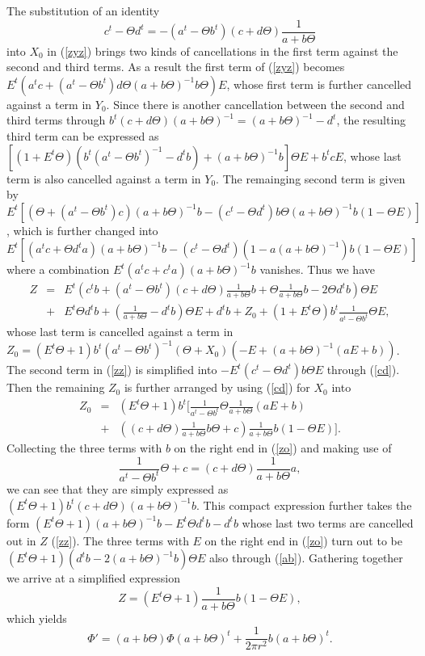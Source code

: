 \documentclass[12pt,a4paper]{article}
\newcommand{\Te}{\Theta}
\begin{document}
The substitution of an identity
\begin{equation}
c^t - \Te d^t = - (a^t - \Te b^t)(c + d\Te)\frac{1}{a + b\Te}
\label{cd}\end{equation}
into $X_0$ in (\ref{zyz}) brings two kinds of cancellations in 
the first term against the second and third terms. As a result 
the first term of (\ref{zyz}) becomes
$E^t(a^tc+(a^t-\Te b^t)d\Te(a+b\Te)^{-1}b\Te)E$, whose first term is
further cancelled against a term in $Y_0$. Since there is 
another cancellation between the second and third terms
through $b^t(c+d\Te)(a+b\Te)^{-1} = (a+b\Te)^{-1} - d^t$,
the resulting third term can be expressed as $[(1+E^t\Te)
(b^t(a^t-\Te b^t)^{-1} - d^tb) + (a+b\Te)^{-1}b]\Te E + b^tcE$, 
whose last term is also cancelled against a term in $Y_0$.
The remainging second term is given by $E^t[(\Te + (a^t-\Te b^t)c)
(a+b\Te)^{-1}b - (c^t-\Te d^t)b\Te(a+b\Te)^{-1}b(1-\Te E)]$,
which is further changed into $E^t[(a^tc + \Te d^ta)(a+b\Te)^{-1}b
-(c^t-\Te d^t)(1-a(a+b\Te)^{-1})b(1-\Te E)]$ where a combination 
$E^t(a^tc+c^ta)(a+b\Te)^{-1}b$ vanishes. Thus we have
\begin{eqnarray}
Z &=& E^t(c^tb + (a^t-\Te b^t)(c + d\Te)\frac{1}{a+b\Te}b + 
\Te\frac{1}{a+b\Te}b -2\Te d^tb)\Te E \nonumber \\
&+& E^t\Te d^tb + (\frac{1}{a+b\Te} - d^tb)\Te E + d^tb + Z_0
+ (1+ E^t\Te)b^t\frac{1}{a^t -\Te b^t}\Te E,
\label{zz}\end{eqnarray}
whose last term is cancelled against a term in $Z_0=(E^t\Te +1)b^t
(a^t-\Te b^t)^{-1}(\Te +X_0)(-E + (a+b\Te)^{-1}(aE+b))$.
The second term in (\ref{zz}) is simplified into $-E^t(c^t-\Te d^t)b
\Te E$ through (\ref{cd}). Then the remaining $Z_0$ is further arranged
by using (\ref{cd}) for $X_0$ into
\begin{eqnarray}
Z_0 &=& (E^t\Te +1)b^t[ \frac{1}{a^t-\Te b^t}\Te\frac{1}{a+b\Te}(aE+b)
\nonumber \\ &+& ((c+d\Te)\frac{1}{a+b\Te}b\Te + c)\frac{1}{a+b\Te}
b(1-\Te E)].
\label{zo}\end{eqnarray}
Collecting the three terms with $b$ on the right end in (\ref{zo}) and
making use of 
\begin{equation}
\frac{1}{a^t - \Te b^t}\Te + c = (c + d\Te)\frac{1}{a + b\Te}a,
\label{ab}\end{equation}
we can see that they are simply expressed as $(E^t\Te +1)b^t(c +d\Te)
(a+b\Te)^{-1}b$. This compact expression further takes the form
$(E^t\Te + 1)(a +b\Te)^{-1}b -E^t\Te d^tb -d^tb$ whose last two terms are
cancelled out in $Z$ (\ref{zz}). The three terms with $E$ on the right 
end in (\ref{zo}) turn out to be $(E^t\Te +1)(d^tb - 2(a+b\Te)^{-1}b)
\Te E$ also through (\ref{ab}). Gathering together we arrive at a
simplified expression
\begin{equation}
Z = (E^t\Te + 1)\frac{1}{a + b\Te} b(1 - \Te E),
\end{equation}
which yields
\begin{equation}
\Phi' = (a + b\Te)\Phi(a + b\Te)^t + \frac{1}{2\pi r^2}b(a + b\Te)^t.
\label{phi}\end{equation}
\end{document}
